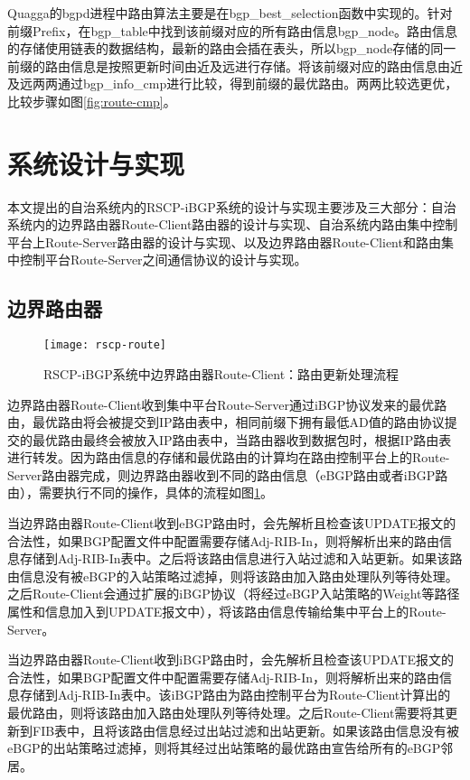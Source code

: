 Quagga的bgpd进程中路由算法主要是在bgp\_best\_selection函数中实现的。针对前缀Prefix，在bgp\_table中找到该前缀对应的所有路由信息bgp\_node。路由信息的存储使用链表的数据结构，最新的路由会插在表头，所以bgp\_node存储的同一前缀的路由信息是按照更新时间由近及远进行存储。将该前缀对应的路由信息由近及远两两通过bgp\_info\_cmp进行比较，得到前缀的最优路由。两两比较选更优，比较步骤如图\ref{fig:route-cmp}。


\section{系统设计与实现}


本文提出的自治系统内的RSCP-iBGP系统的设计与实现主要涉及三大部分：自治系统内的边界路由器Route-Client路由器的设计与实现、自治系统内路由集中控制平台上Route-Server路由器的设计与实现、以及边界路由器Route-Client和路由集中控制平台Route-Server之间通信协议的设计与实现。


\subsection{边界路由器}

\begin{figure}
  \centering
  \texttt{[image: rscp-route]}
  \caption{RSCP-iBGP系统中边界路由器Route-Client：路由更新处理流程}
  \label{fig:rscp-route}
\end{figure}



边界路由器Route-Client收到集中平台Route-Server通过iBGP协议发来的最优路由，最优路由将会被提交到IP路由表中，相同前缀下拥有最低AD值的路由协议提交的最优路由最终会被放入IP路由表中，当路由器收到数据包时，根据IP路由表进行转发\cite{DianeTeare2016CCNP}。因为路由信息的存储和最优路由的计算均在路由控制平台上的Route-Server路由器完成，则边界路由器收到不同的路由信息（eBGP路由或者iBGP路由），需要执行不同的操作，具体的流程如图\ref{fig:rscp-route}。

当边界路由器Route-Client收到eBGP路由时，会先解析且检查该UPDATE报文的合法性，如果BGP配置文件中配置需要存储Adj-RIB-In，则将解析出来的路由信息存储到Adj-RIB-In表中。之后将该路由信息进行入站过滤和入站更新。如果该路由信息没有被eBGP的入站策略过滤掉，则将该路由加入路由处理队列等待处理。之后Route-Client会通过扩展的iBGP协议（将经过eBGP入站策略的Weight等路径属性和信息加入到UPDATE报文中），将该路由信息传输给集中平台上的Route-Server。


当边界路由器Route-Client收到iBGP路由时，会先解析且检查该UPDATE报文的合法性，如果BGP配置文件中配置需要存储Adj-RIB-In，则将解析出来的路由信息存储到Adj-RIB-In表中。该iBGP路由为路由控制平台为Route-Client计算出的最优路由，则将该路由加入路由处理队列等待处理。之后Route-Client需要将其更新到FIB表中，且将该路由信息经过出站过滤和出站更新。如果该路由信息没有被eBGP的出站策略过滤掉，则将其经过出站策略的最优路由宣告给所有的eBGP邻居。



